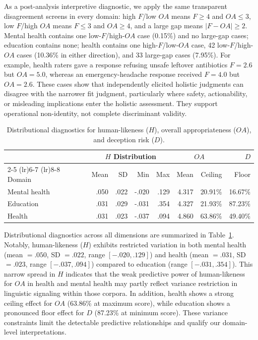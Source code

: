 \documentclass[manuscript,review,anonymous]{acmart}
\begin{document}
As a post-analysis interpretive diagnostic, we apply the same transparent disagreement screens in every domain: high $F$/low $OA$ means $F\geq4$ and $OA\leq3$, low $F$/high $OA$ means $F\leq3$ and $OA\geq4$, and a large gap means $|F-OA|\geq2$. Mental health contains one low-$F$/high-$OA$ case (0.15\%) and no large-gap cases; education contains none; health contains one high-$F$/low-$OA$ case, 42 low-$F$/high-$OA$ cases (10.36\% in either direction), and 33 large-gap cases (7.95\%). For example, health raters gave a response refusing unsafe leftover antibiotics $F=2.6$ but $OA=5.0$, whereas an emergency-headache response received $F=4.0$ but $OA=2.6$. These cases show that independently elicited holistic judgments can disagree with the narrower fit judgment, particularly where safety, actionability, or misleading implications enter the holistic assessment. They support operational non-identity, not complete discriminant validity.



\begin{table}[t]
\centering
\small
\caption{Distributional diagnostics for human-likeness ($H$), overall appropriateness ($OA$), and deception risk ($D$).}
\label{tab:ceiling}
\begin{tabular}{lrrrrrrr}
\toprule
 & \multicolumn{4}{c}{$H$ Distribution} & \multicolumn{2}{c}{$OA$} & $D$ \\
\cmidrule(lr){2-5} \cmidrule(lr){6-7} \cmidrule(lr){8-8}
Domain & Mean & SD & Min & Max & Mean & Ceiling & Floor \\
\midrule
Mental health & .050 & .022 & -.020 & .129 & 4.317 & 20.91\% & 16.67\% \\
Education     & .031 & .029 & -.031 & .354 & 4.327 & 21.93\% & 87.23\% \\
Health        & .031 & .023 & -.037 & .094 & 4.860 & 63.86\% & 49.40\% \\
\bottomrule
\end{tabular}
\end{table}


Distributional diagnostics across all dimensions are summarized in Table~\ref{tab:ceiling}. Notably, human-likeness ($H$) exhibits restricted variation in both mental health (mean $= .050$, SD $= .022$, range $[-.020, .129]$) and health (mean $= .031$, SD $= .023$, range $[-.037, .094]$) compared to education (range $[-.031, .354]$). This narrow spread in $H$ indicates that the weak predictive power of human-likeness for $OA$ in health and mental health may partly reflect variance restriction in linguistic signaling within those corpora. In addition, health shows a strong ceiling effect for $OA$ (63.86\% at maximum score), while education shows a pronounced floor effect for $D$ (87.23\% at minimum score). These variance constraints limit the detectable predictive relationships and qualify our domain-level interpretations.
\end{document}
